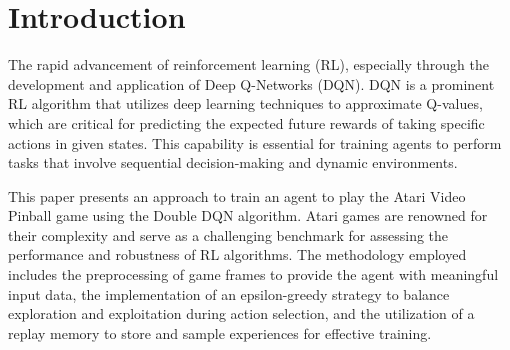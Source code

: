 \section{Introduction}\label{sec:page-layout}
The rapid advancement of reinforcement learning (RL), especially through the development and application of Deep Q-Networks (DQN). DQN is a prominent RL algorithm that utilizes deep learning techniques to approximate Q-values, which are critical for predicting the expected future rewards of taking specific actions in given states. This capability is essential for training agents to perform tasks that involve sequential decision-making and dynamic environments.

This paper presents an approach to train an agent to play the Atari Video Pinball game using the Double DQN algorithm. Atari games are renowned for their complexity and serve as a challenging benchmark for assessing the performance and robustness of RL algorithms. The methodology employed includes the preprocessing of game frames to provide the agent with meaningful input data, the implementation of an epsilon-greedy strategy to balance exploration and exploitation during action selection, and the utilization of a replay memory to store and sample experiences for effective training.

